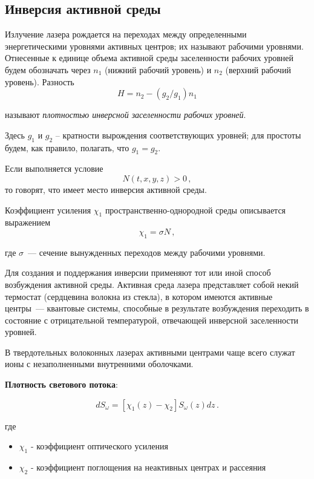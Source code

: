 \documentclass[12pt]{article}
\begin{document}
\newpage

\subsection{Инверсия активной среды}

Излучение лазера рождается на переходах между определенными энергетическими уровнями активных центров; их называют $\textbf{рабочими уровнями}$. Отнесенные к единице объема активной среды заселенности рабочих уровней будем обозначать через $n_1$ (нижний рабочий уровень) и $n_2$ (верхний рабочий уровень). Разность
\[
H = n_2 - (g_2/g_1)n_1 \tag{1}
\]

называют 
\emph{плотностью инверсной заселенности рабочих уровней}. 


Здесь $g_1$ и $g_2$ -- кратности вырождения соответствующих уровней; для простоты будем, как правило, полагать, что $g_1 = g_2$.

Если выполняется условие
\[
N(t,x,y,z) > 0\,, \tag{2}
\]
то говорят, что имеет место $\textbf{инверсия активной среды}$.
\par
Коэффициент усиления $\chi_1$ пространственно-однородной среды описывается выражением
\[
\chi_1 = \sigma N\,,\tag{3}
\]

где $\sigma$~--- сечение вынужденных переходов между рабочими уровнями.

\par

Для создания и поддержания инверсии применяют тот или иной способ возбуждения активной среды. Активная среда лазера представляет собой некий термостат (сердцевина волокна из стекла), в котором имеются активные центры~--- квантовые системы, способные в результате возбуждения переходить в состояние с отрицательной температурой, отвечающей инверсной заселенности уровней.

В твердотельных волоконных лазерах активными центрами чаще всего служат ионы с незаполненными внутренними оболочками.

\par

\textbf{Плотность светового потока}:

\[
dS_\omega = [\chi_1(z) - \chi_2] S_\omega(z) dz\,.\tag{4}
\]

где
\begin{itemize}
    \item $\chi_1$ - коэффициент оптического усиления
    \item $\chi_2$ - коэффициент поглощения на неактивных центрах и рассеяния
\end{itemize}
\end{document}
